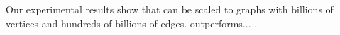 Our experimental results show that \algname can be scaled to graphs with billions of vertices and hundreds of billions of edges. \algname outperforms... .